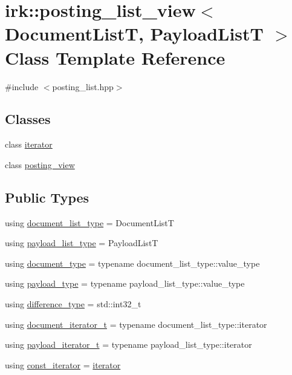 \hypertarget{classirk_1_1posting__list__view}{}\section{irk\+:\+:posting\+\_\+list\+\_\+view$<$ Document\+ListT, Payload\+ListT $>$ Class Template Reference}
\label{classirk_1_1posting__list__view}


{\ttfamily \#include $<$posting\+\_\+list.\+hpp$>$}

\subsection*{Classes}
\begin{DoxyCompactItemize}
\item 
class \mbox{\hyperlink{classirk_1_1posting__list__view_1_1iterator}{iterator}}
\item 
class \mbox{\hyperlink{classirk_1_1posting__list__view_1_1posting__view}{posting\+\_\+view}}
\end{DoxyCompactItemize}
\subsection*{Public Types}
\begin{DoxyCompactItemize}
\item 
using \mbox{\hyperlink{classirk_1_1posting__list__view_ae024545dbbb464926a2024d956b7b7af}{document\+\_\+list\+\_\+type}} = Document\+ListT
\item 
using \mbox{\hyperlink{classirk_1_1posting__list__view_aabf1afcb3a994971f30879354301e1fe}{payload\+\_\+list\+\_\+type}} = Payload\+ListT
\item 
using \mbox{\hyperlink{classirk_1_1posting__list__view_ac4615e6e3d8ee1eb9a847b7a34919977}{document\+\_\+type}} = typename document\+\_\+list\+\_\+type\+::value\+\_\+type
\item 
using \mbox{\hyperlink{classirk_1_1posting__list__view_a1c394061061a8eeeab98cb228f6cdde9}{payload\+\_\+type}} = typename payload\+\_\+list\+\_\+type\+::value\+\_\+type
\item 
using \mbox{\hyperlink{classirk_1_1posting__list__view_af57ab26b3de14b52ca2150cd90288567}{difference\+\_\+type}} = std\+::int32\+\_\+t
\item 
using \mbox{\hyperlink{classirk_1_1posting__list__view_abaca622760e6da2c67d55cf35207250f}{document\+\_\+iterator\+\_\+t}} = typename document\+\_\+list\+\_\+type\+::iterator
\item 
using \mbox{\hyperlink{classirk_1_1posting__list__view_a5a153169348a164ea2cb1a18dc76e279}{payload\+\_\+iterator\+\_\+t}} = typename payload\+\_\+list\+\_\+type\+::iterator
\item 
using \mbox{\hyperlink{classirk_1_1posting__list__view_ae21b790c3e482f513bb41d4f8e7ae0c9}{const\+\_\+iterator}} = \mbox{\hyperlink{classirk_1_1posting__list__view_1_1iterator}{iterator}}
\end{DoxyCompactItemize}
